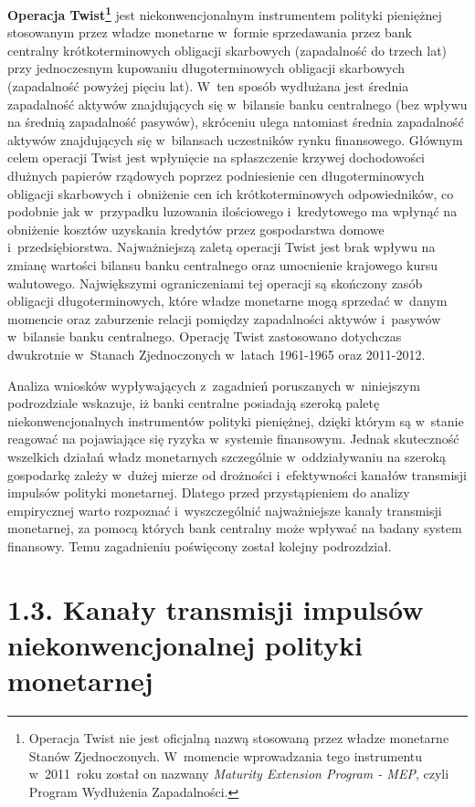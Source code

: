 \textbf{Operacja Twist\footnote{Operacja Twist nie jest oficjalną nazwą stosowaną przez władze monetarne Stanów Zjednoczonych. W~momencie wprowadzania tego instrumentu w~2011~roku został on nazwany \textit{Maturity Extension Program - MEP}, czyli Program Wydłużenia Zapadalności.}} jest niekonwencjonalnym instrumentem polityki pieniężnej stosowanym przez władze monetarne w~formie sprzedawania przez bank centralny krótkoterminowych obligacji skarbowych (zapadalność do trzech lat) przy jednoczesnym kupowaniu długoterminowych obligacji skarbowych (zapadalność powyżej pięciu lat). W~ten sposób wydłużana jest średnia zapadalność aktywów znajdujących się w~bilansie banku centralnego (bez wpływu na średnią zapadalność pasywów), skróceniu ulega natomiast średnia zapadalność aktywów znajdujących się w~bilansach uczestników rynku finansowego. Głównym celem operacji Twist jest wpłynięcie na spłaszczenie krzywej dochodowości dłużnych papierów rządowych poprzez podniesienie cen długoterminowych obligacji skarbowych i~obniżenie cen ich krótkoterminowych odpowiedników, co podobnie jak w~przypadku luzowania ilościowego i~kredytowego ma wpłynąć na obniżenie kosztów uzyskania kredytów przez gospodarstwa domowe i~przedsiębiorstwa. Najważniejszą zaletą operacji Twist jest brak wpływu na zmianę wartości bilansu banku centralnego oraz umocnienie krajowego kursu walutowego. Największymi ograniczeniami tej operacji są skończony zasób obligacji długoterminowych, które władze monetarne mogą sprzedać w~danym momencie oraz zaburzenie relacji pomiędzy zapadalności aktywów i~pasywów w~bilansie banku centralnego. Operację Twist zastosowano dotychczas dwukrotnie w~Stanach Zjednoczonych w~latach 1961-1965 oraz 2011-2012.

Analiza wniosków wypływających z~zagadnień poruszanych w~niniejszym podrozdziale wskazuje, iż banki centralne posiadają szeroką paletę niekonwencjonalnych instrumentów polityki pieniężnej, dzięki którym są w~stanie reagować na pojawiające się ryzyka w~systemie finansowym. Jednak skuteczność wszelkich działań władz monetarnych szczególnie w~oddziaływaniu na szeroką gospodarkę zależy w~dużej mierze od drożności i~efektywności kanałów transmisji impulsów polityki monetarnej. Dlatego przed przystąpieniem do analizy empirycznej warto rozpoznać i~wyszczególnić najważniejsze kanały transmisji monetarnej, za pomocą których bank centralny może wpływać na badany system finansowy. Temu zagadnieniu poświęcony został kolejny podrozdział.

\section*{\large{1.3. Kanały transmisji impulsów niekonwencjonalnej polityki monetarnej}}


